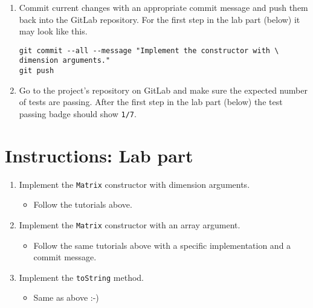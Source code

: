 \begin{enumerate}
\begin{enumerate}
  \item
    Look for a summary line. After the first step in the lab part (below) it should look like this:
\begin{verbatim}
[ERROR] Tests run: 7, Failures: 6, Errors: 0, Skipped: 0
\end{verbatim}

  \end{enumerate}
\item
  Commit current changes with an appropriate commit message and push them back into the GitLab repository. For the first step in the lab part (below) it may look like this.

\begin{verbatim}
git commit --all --message "Implement the constructor with \ 
dimension arguments."
git push
\end{verbatim}
\item
  Go to the project's repository on GitLab and make sure the expected number of tests are passing. After the first step in the lab part (below) the test passing badge should show \texttt{1/7}.
\end{enumerate}

\section{Instructions: Lab part}\label{instructions-lab-part}

\begin{enumerate}
\def\labelenumi{\arabic{enumi}.}
\item
  Implement the \texttt{Matrix} constructor with dimension arguments.

  \begin{itemize}
  \item
    Follow the tutorials above.
  \end{itemize}
\item
  Implement the \texttt{Matrix} constructor with an array argument.

  \begin{itemize}
  \item
    Follow the same tutorials above with a specific implementation and a commit message.
  \end{itemize}
\item
  Implement the \texttt{toString} method.

  \begin{itemize}
  \item
    Same as above :-)
  \end{itemize}
\end{enumerate}

